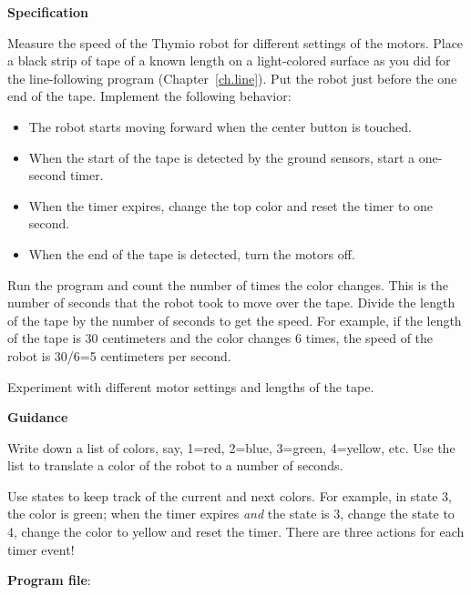 
\label{ch.speed}

\textbf{Specification}

Measure the speed of the Thymio robot for different settings of the
motors. Place a black strip of tape of a known length on a light-colored
surface as you did for the line-following program
(Chapter~\ref{ch.line}). Put the robot just before the one end of the
tape. Implement the following behavior:

\begin{itemize}

\item The robot starts moving forward when the center button is touched.

\item When the start of the tape is detected by the ground sensors,
start a one-second timer.

\item When the timer expires, change the top color and reset the timer
to one second.

\item When the end of the tape is detected, turn the motors off.

\end{itemize} 

Run the program and count the number of times the color changes. This is
the number of seconds that the robot took to move over the tape. Divide
the length of the tape by the number of seconds to get the speed. For
example, if the length of the tape is 30 centimeters and the color
changes 6 times, the speed of the robot is 30/6=5 centimeters per
second.

Experiment with different motor settings and lengths of the tape.

\textbf{Guidance}

Write down a list of colors, say, 1=red, 2=blue, 3=green, 4=yellow, etc.
Use the list to translate a color of the robot to a number of seconds.

Use states to keep track of the current and next colors. For example, in
state 3, the color is green; when the timer expires \emph{and} the state
is 3, change the state to 4, change the color to yellow and reset the
timer. There are three actions for each timer event!  

\bigskip

{\raggedleft \hfill \textbf{Program file}: }
